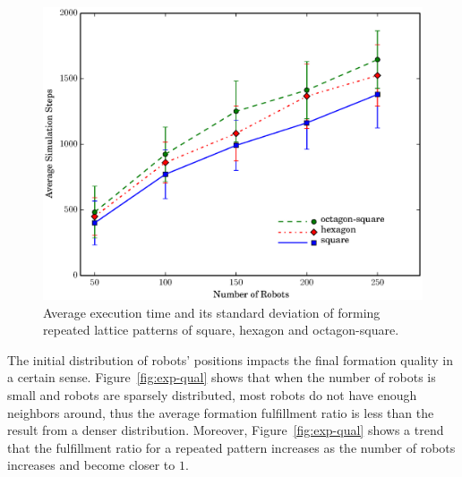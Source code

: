 \begin{figure}
    \centering
   \includegraphics[width=\textwidth]{figs/exp_time}
    \caption{Average execution time and its standard deviation of forming repeated lattice patterns of square, hexagon and octagon-square.} 
    \label{fig:exp-time}
\end{figure}

The initial distribution of robots' positions impacts the final formation quality in a certain sense.
%
Figure~\ref{fig:exp-qual} shows that when the number of robots is small and robots are sparsely distributed, most robots do not have enough neighbors around, thus the average formation fulfillment ratio is less than the result from a denser distribution. 
%
Moreover, Figure~\ref{fig:exp-qual} shows a trend that the fulfillment ratio for
a repeated pattern increases as the number of robots increases and become closer to $1$.

